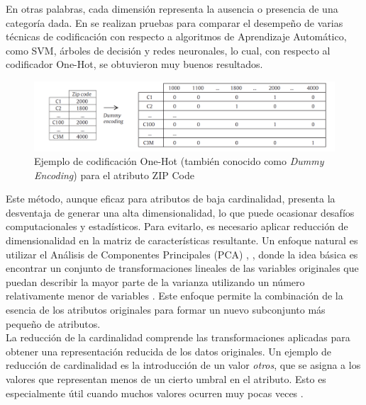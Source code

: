 En otras palabras, cada dimensión representa la ausencia o presencia de una categoría dada. En \citep{hooi2022feature} se realizan pruebas para comparar el desempeño de varias técnicas de codificación con respecto a algoritmos de Aprendizaje Automático, como SVM, árboles de decisión y redes neuronales, lo cual, con respecto al codificador One-Hot, se obtuvieron muy buenos resultados. \\
\begin{figure}[H]
	\centering
	\includegraphics[width=0.8\linewidth]{"figuras/capi 1/one-hot-ejemplo"}
	\caption{Ejemplo de codificación One-Hot (también conocido como \textit{Dummy Encoding}) para el atributo ZIP Code}
	\label{fig:one-hot-ejemplo}
\end{figure}
Este método, aunque eficaz para atributos de baja cardinalidad, presenta la desventaja de generar una alta dimensionalidad, lo que puede ocasionar desafíos computacionales y estadísticos. Para evitarlo, es necesario aplicar reducción de dimensionalidad en la matriz de características resultante. Un enfoque natural es utilizar el Análisis de Componentes Principales (PCA) \citep{mahmood2022accurate}, \citep{kasemtaweechok2021large} , donde la idea básica es encontrar un conjunto de transformaciones lineales de las variables originales que puedan describir la mayor parte de la varianza utilizando un número relativamente menor de variables \citep{garcia2015data}. Este enfoque permite la combinación de la esencia de los atributos originales para formar un nuevo subconjunto más pequeño de atributos. \\
La reducción de la cardinalidad comprende las transformaciones aplicadas para obtener una representación reducida de los datos originales. Un ejemplo de reducción de cardinalidad es la introducción de un valor \textit{otros}, que se asigna a los valores que representan menos de un cierto umbral en el atributo. Esto es especialmente útil cuando muchos valores ocurren muy pocas veces \citep{ventevogel2020construction}.

